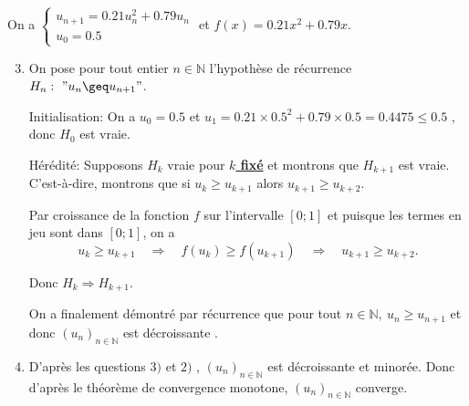 \documentclass[15pt, mathserif]{beamer}
\begin{document}
\begin{frame}On a $\begin{cases} u_{n+1} = 0.21u_n^2+0.79u_n\\[1em] u_0 = 0.5\end{cases}$ et $f(x) = 0.21x^2+0.79x$.

\begin{enumerate}\setcounter{enumi}{2}

	\item On pose pour tout entier $n \in \mathbb{N}$ l'hypothèse de récurrence $H_n:~" u_n \geq u_{n+1}"$.

\medskip

Initialisation: On a $u_0 =0.5$ et $u_1 = 0.21\times0.5^2+0.79\times0.5 = 0.4475\leq 0.5$ , donc $H_0$ est vraie.

\medskip

Hérédité: Supposons $H_k$ vraie pour \textbf\underline{{$k$ fixé}} et montrons que $H_{k+1}$ est vraie. C'est-à-dire, montrons que si $u_k \geq  u_{k+1}$ alors $u_{k+1} \geq  u_{k+2}$.

 Par croissance de la fonction $f$ sur l'intervalle $[0;1]$ et puisque les termes en jeu sont dans $[0;1]$, on a \[ u_k \geq u_{k+1} \quad \Rightarrow \quad f(u_k) \geq  f(u_{k+1}) \quad \Rightarrow \quad  u_{k+1}\geq u_{k+2}. \]

Donc $H_{k} \Rightarrow H_{k+1}$.

 On a finalement démontré par récurrence que pour tout $n \in\mathbb{N},~ u_n \geq u_{n+1}$ et donc $(u_n)_{n\in\mathbb{N}}$ est décroissante .

\end{enumerate}
\end{frame}


\begin{frame}

\begin{enumerate}\setcounter{enumi}{3}

	\item D'après les questions $3)$ et $2)$ , $(u_n)_{n\in\mathbb{N}}$ est décroissante et minorée. Donc d'après le théorème de convergence monotone, $(u_n)_{n\in\mathbb{N}}$ converge.

\end{enumerate}\end{frame}
\end{document}
